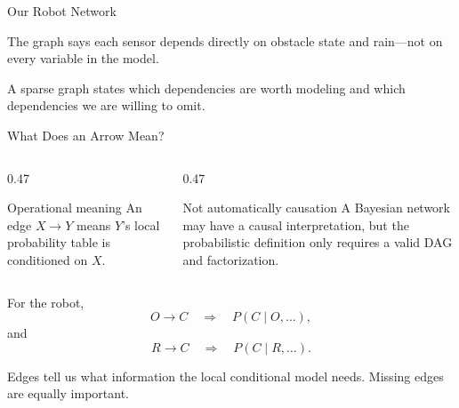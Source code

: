 \documentclass[aspectratio=169,10pt]{beamer}
\begin{document}
\begin{frame}[shrink=10]{Our Robot Network}
  \begin{center}
  \end{center}

  The graph says each sensor depends directly on obstacle state and rain---not on every variable in the model.

  \begin{keyidea}
    A sparse graph states which dependencies are worth modeling and which dependencies we are willing to omit.
  \end{keyidea}
\end{frame}

\begin{frame}[shrink=10]{What Does an Arrow Mean?}
  \begin{columns}[T,onlytextwidth]
    \begin{column}{0.47\textwidth}
      \begin{block}{Operational meaning}
        An edge $X\rightarrow Y$ means $Y$'s local probability table is conditioned on $X$.
      \end{block}
    \end{column}
    \begin{column}{0.47\textwidth}
      \begin{block}{Not automatically causation}
        A Bayesian network may have a causal interpretation, but the probabilistic definition only requires a valid DAG and factorization.
      \end{block}
    \end{column}
  \end{columns}

  For the robot,
  \[
    O\rightarrow C
    \quad\Longrightarrow\quad
    P(C\mid O,\ldots),
  \]
  and
  \[
    R\rightarrow C
    \quad\Longrightarrow\quad
    P(C\mid R,\ldots).
  \]

  \begin{keyidea}
    Edges tell us what information the local conditional model needs. Missing edges are equally important.
  \end{keyidea}
\end{frame}
\end{document}
